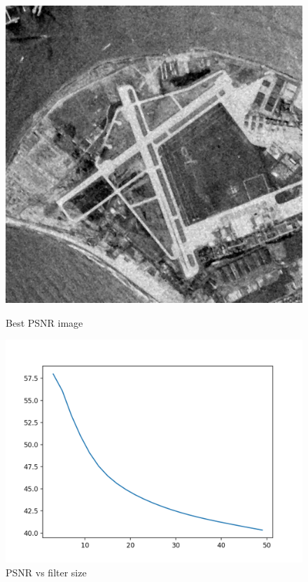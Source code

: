 \documentclass{article}
\begin{document}
    \begin{figure}[!htb]
      \includegraphics[scale=0.3]{./basic_denoising/sandiego/median_best_gaussian.png}
      \caption{Best PSNR image}
    \endminipage \hfill
      \includegraphics[scale=.45]{./basic_denoising/sandiego/median_psnr_gaussian.png}
      \caption{PSNR vs filter size}
    \endminipage
    \end{figure}
    \pagebreak
\end{document}
